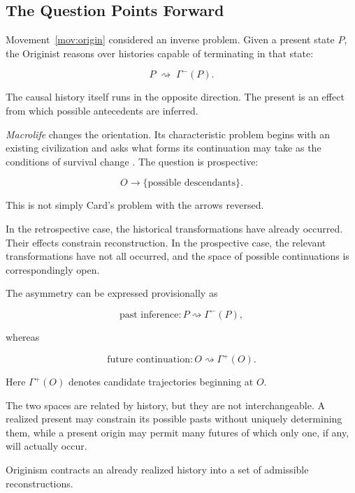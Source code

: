 \documentclass[
  11pt,
  a4paper,
  DIV=12,
  BCOR=0mm,
  parskip=half-
]{scrartcl}
\theoremstyle{definition}
\theoremstyle{plain}
\theoremstyle{remark}
\begin{document}

\subsection{The Question Points Forward}
\label{sec:question-forward}

Movement~\ref{mov:origin} considered an inverse problem. Given a present state
\(P\), the Originist reasons over histories capable of terminating in that
state:

\[
  P
  \;\rightsquigarrow\;
  \Gamma^{-}(P).
\]

The causal history itself runs in the opposite direction. The present is an
effect from which possible antecedents are inferred.

\emph{Macrolife} changes the orientation. Its characteristic problem begins
with an existing civilization and asks what forms its continuation may take
as the conditions of survival change \cite{zebrowski1979}. The question is
prospective:

\[
  O
  \longrightarrow
  \{\text{possible descendants}\}.
\]

This is not simply Card's problem with the arrows reversed.

In the retrospective case, the historical transformations have already
occurred. Their effects constrain reconstruction. In the prospective case,
the relevant transformations have not all occurred, and the space of possible
continuations is correspondingly open.

The asymmetry can be expressed provisionally as

\[
  \text{past inference}
  :
  P\rightsquigarrow\Gamma^{-}(P),
\]

whereas

\[
  \text{future continuation}
  :
  O\rightsquigarrow\Gamma^{+}(O).
\]

Here \(\Gamma^{+}(O)\) denotes candidate trajectories beginning at \(O\).

The two spaces are related by history, but they are not interchangeable.
A realized present may constrain its possible pasts without uniquely
determining them, while a present origin may permit many futures of which
only one, if any, will actually occur.

Originism contracts an already realized history into a set of admissible
reconstructions.
\end{document}
